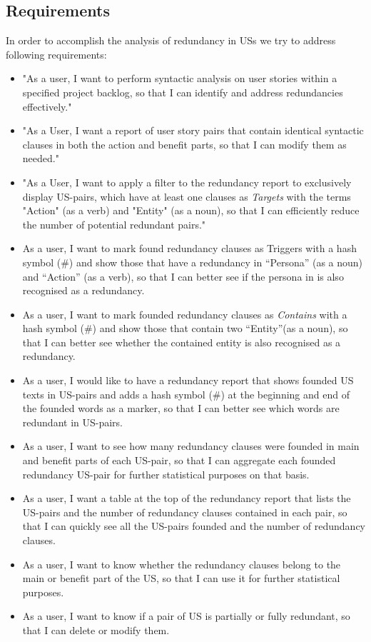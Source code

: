 \subsection{Requirements}\label{redundancy_requirement}
In order to accomplish the analysis of redundancy in USs we try to address following requirements:
\begin{itemize}

\item "As a user, I want to perform syntactic analysis on user stories within a specified project backlog, so that I can identify and address redundancies effectively."

\item "As a User, I want a report of user story pairs that contain identical syntactic clauses in both the action and benefit parts, so that I can modify them as needed."

\item "As a User, I want to apply a filter to the redundancy report to exclusively display US-pairs, which have at least one clauses as \textit{Targets} with the terms "Action" (as a verb) and "Entity" (as a noun), so that I can efficiently reduce the number of potential redundant pairs."

\item As a user, I want to mark found redundancy clauses as Triggers with a hash symbol (\#) and show those that have a redundancy in \enquote{Persona} (as a noun) and \enquote{Action} (as a verb), so that I can better see if the persona in is also recognised as a redundancy.

\item As a user, I want to mark founded redundancy clauses as \textit{Contains} with a hash symbol (\#) and show those that contain two \enquote{Entity}(as a noun), so that I can better see whether the contained entity is also recognised as a redundancy.

\item As a user, I would like to have a redundancy report that shows founded US texts in US-pairs and adds a hash symbol (\#) at the beginning and end of the founded words as a marker, so that I can better see which words are redundant in US-pairs.

\item As a user, I want to see how many redundancy clauses were founded in main and benefit parts of each US-pair, so that I can aggregate each founded redundancy US-pair for further statistical purposes on that basis.

\item As a user, I want a table at the top of the redundancy report that lists the US-pairs and the number of redundancy clauses contained in each pair, so that I can quickly see all the US-pairs founded and the number of redundancy clauses.

\item As a user, I want to know whether the redundancy clauses belong to the main or benefit part of the US, so that I can use it for further statistical purposes.

\item As a user, I want to know if a pair of US is partially or fully redundant, so that I can delete or modify them.
\end{itemize}
